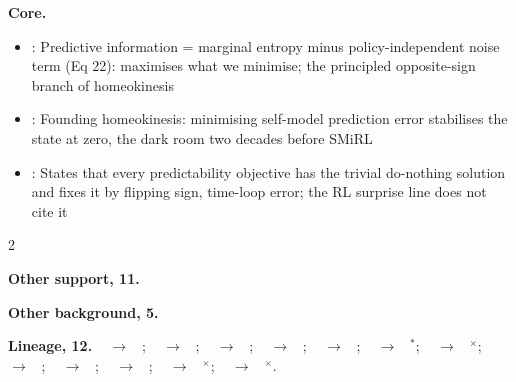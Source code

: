 \documentclass[10pt]{article}
\newcommand{\memb}[1]{\par\smallskip\textbf{#1}\quad}
\begin{document}
\memb{Core.}
\begin{itemize}[nosep,leftmargin=1.2em]
\item \citet{Ay-predictive08}: Predictive information = marginal entropy minus policy-independent noise term (Eq 22): maximises what we minimise; the principled opposite-sign branch of homeokinesis
\item \citet{Der-homeokinesis99}: Founding homeokinesis: minimising self-model prediction error stabilises the state at zero, the dark room two decades before SMiRL
\item \citet{Der-true02}: States that every predictability objective has the trivial do-nothing solution and fixes it by flipping sign, time-loop error; the RL surprise line does not cite it
\end{itemize}
\begin{multicols}{2}
\memb{Other support, 11.} \citetext{\citealp{Bialek-predictability01}; \citealp{Still-information09}; \citealp{Ay-information12}; \citealp{Little-learning13}; \citealp{Little-maximal13}; \citealp{Martius-information13}; \citealp{Salge-empowerment13}; \citealp{Zahedi-linear13}; \citealp{Lee-predictive20}; \citealp{Markovic-selforganized10}; \citealp{Der-playful12}\dag}

\memb{Other background, 5.} {\footnotesize \citetext{\citealp{Zahedi-higher10}; \citealp{Still-thermodynamics12}; \citealp{Prokopenko-homeotaxis08}; \citealp{Martius-variants12}; \citealp{Smith-homeokinetic12}}}

\end{multicols}
\memb{Lineage, 12.} {\footnotesize \citeauthor{Cannon-organization29}~\citeyear{Cannon-organization29} $\to$ \citeauthor{Der-homeokinesis99}~\citeyear{Der-homeokinesis99}; \citeauthor{Der-homeokinesis99}~\citeyear{Der-homeokinesis99} $\to$ \citeauthor{Der-true02}~\citeyear{Der-true02}; \citeauthor{Bialek-predictability01}~\citeyear{Bialek-predictability01} $\to$ \citeauthor{Ay-predictive08}~\citeyear{Ay-predictive08}; \citeauthor{Bialek-predictability01}~\citeyear{Bialek-predictability01} $\to$ \citeauthor{Still-information09}~\citeyear{Still-information09}; \citeauthor{Der-true02}~\citeyear{Der-true02} $\to$ \citeauthor{Ay-predictive08}~\citeyear{Ay-predictive08}; \citeauthor{Der-true02}~\citeyear{Der-true02} $\to$ \citeauthor{Markovic-selforganized10}~\citeyear{Markovic-selforganized10}$^\ast$; \citeauthor{Ay-information08}~\citeyear{Ay-information08} $\to$ \citeauthor{Ay-predictive08}~\citeyear{Ay-predictive08}$^\times$; \citeauthor{Ay-predictive08}~\citeyear{Ay-predictive08} $\to$ \citeauthor{Ay-information12}~\citeyear{Ay-information12}; \citeauthor{Ay-predictive08}~\citeyear{Ay-predictive08} $\to$ \citeauthor{Martius-information13}~\citeyear{Martius-information13}; \citeauthor{Ay-predictive08}~\citeyear{Ay-predictive08} $\to$ \citeauthor{Zahedi-linear13}~\citeyear{Zahedi-linear13}; \citeauthor{Still-information09}~\citeyear{Still-information09} $\to$ \citeauthor{Still-information12}~\citeyear{Still-information12}$^\times$; \citeauthor{Still-information09}~\citeyear{Still-information09} $\to$ \citeauthor{Marzen-resourcerational24}~\citeyear{Marzen-resourcerational24}$^\times$.}
\end{document}
